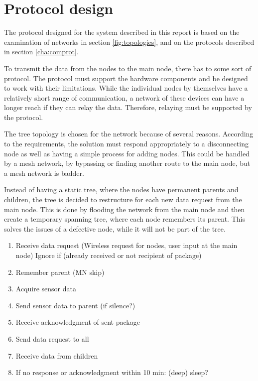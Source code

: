 \section{Protocol design}
The protocol designed for the system described in this report is based on the examination of networks in section \ref{fig:topologies}, and on the protocols described in section \ref{cha:comprot}.

To transmit the data from the nodes to the main node, there has to some sort of protocol. The protocol must support the hardware components and be designed to work with their limitations. While the individual nodes by themselves have a relatively short range of communication, a network of these devices can have a longer reach if they can relay the data. Therefore, relaying must be supported by the protocol. 

The tree topology is chosen for the network because of several reasons. According to the requirements, the solution must respond appropriately to a disconnecting node as well as having a simple process for adding nodes. This could be handled by a mesh network, by bypassing or finding another route to the main node, but a mesh network  is badder. 

Instead of having a static tree, where the nodes have permanent parents and children, the tree is decided to restructure for each new data request from the main node. This is done by flooding the network from the main node and then create a temporary spanning tree, where each node remembers its parent. This solves the issues of a defective node, while it will not be part of the tree.

\begin{enumerate}
	\item Receive data request (Wireless request for nodes, user input at the main node)
		\subitem Ignore if (already received or not recipient of package)
	\item Remember parent (MN skip)
	\item Acquire sensor data
	\item Send sensor data to parent (if silence?)
	\item Receive acknowledgment of sent package
	\item Send data request to all
	\item Receive data from children
	\item If no response or acknowledgment within 10 min: (deep) sleep?
\end{enumerate}

